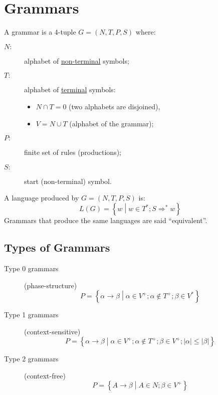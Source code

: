 \section{Grammars}
A grammar is a 4-tuple $G = (N, T, P, S)$ where:
\begin{description}
    \item[$N:$] alphabet of \underline{non-terminal} symbols;
    \item[$T:$] alphabet of \underline{terminal} symbols:
    \begin{itemize}
        \item $N \cap T = 0$ (two alphabets are disjoined),
        \item $V = N \cup T$ (alphabet of the grammar);
    \end{itemize}
    \item[$P:$] finite set of rules (productions);
    \item[$S:$] start (non-terminal) symbol.
\end{description}

A language produced by $G = (N, T, P, S)$ is:
$$
    L(G) = \left\{w \middle| w \in T^\ast; S \Rightarrow^\ast w\right\}
$$
Grammars that produce the same languages are said ``equivalent''.

\subsection{Types of Grammars}
\begin{description}
    \item[Type 0 grammars] (phase-structure)
        $$
            P = \left\{\alpha \to \beta \middle| \alpha \in V^+; \alpha \notin T^+; \beta \in V^\ast \right\}
        $$
    \item[Type 1 grammars] (context-sensitive)
        $$
            P = \left\{\alpha \to \beta \middle| \alpha \in V^+; \alpha \notin T^+; \beta \in V^+; |\alpha| \leq |\beta| \right\}
        $$
    \item[Type 2 grammars] (context-free)
        $$
            P = \left\{A \to \beta \middle| A \in N; \beta \in V^+ \right\}
        $$
\end{description}

